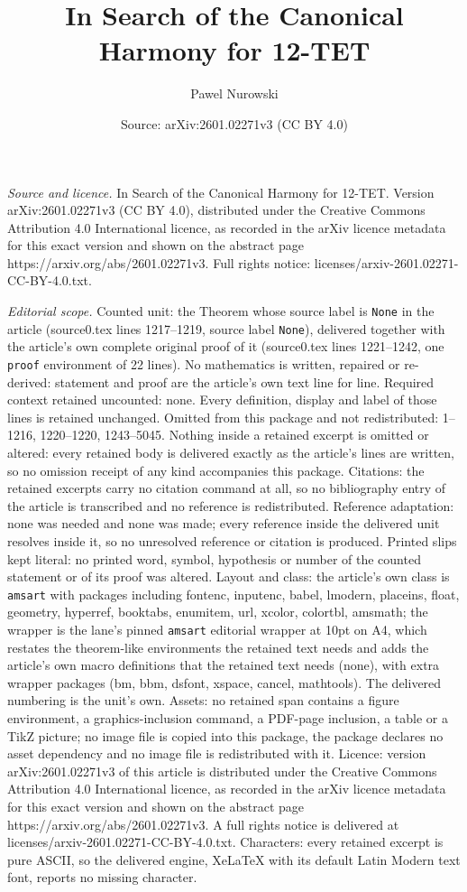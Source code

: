 \documentclass[10pt,a4paper]{amsart}
\title[In Search of the Canonical Harmony for 12-TET]{In Search of the Canonical Harmony for 12-TET}
\author{Pawel Nurowski}
\date{Source: arXiv:2601.02271v3 (CC BY 4.0)}
\begin{document}
\maketitle

\noindent\emph{Source and licence.} In Search of the Canonical Harmony for 12-TET. Version arXiv:2601.02271v3 (CC BY 4.0), distributed under the Creative Commons Attribution 4.0 International licence, as recorded in the arXiv licence metadata for this exact version and shown on the abstract page https://arxiv.org/abs/2601.02271v3. Full rights notice: licenses/arxiv-2601.02271-CC-BY-4.0.txt.\par\smallskip

\noindent\textit{Editorial scope.} Counted unit: the Theorem whose source label is \texttt{None} in the article (source0.tex lines 1217--1219, source label \texttt{None}), delivered together with the article's own complete original proof of it (source0.tex lines 1221--1242, one \texttt{proof} environment of 22 lines). No mathematics is written, repaired or re-derived: statement and proof are the article's own text line for line. Required context retained uncounted: none. Every definition, display and label of those lines is retained unchanged. Omitted from this package and not redistributed: 1--1216, 1220--1220, 1243--5045. Nothing inside a retained excerpt is omitted or altered: every retained body is delivered exactly as the article's lines are written, so no omission receipt of any kind accompanies this package. Citations: the retained excerpts carry no citation command at all, so no bibliography entry of the article is transcribed and no reference is redistributed. Reference adaptation: none was needed and none was made; every reference inside the delivered unit resolves inside it, so no unresolved reference or citation is produced. Printed slips kept literal: no printed word, symbol, hypothesis or number of the counted statement or of its proof was altered. Layout and class: the article's own class is \texttt{amsart} with packages including fontenc, inputenc, babel, lmodern, placeins, float, geometry, hyperref, booktabs, enumitem, url, xcolor, colortbl, amsmath; the wrapper is the lane's pinned \texttt{amsart} editorial wrapper at 10pt on A4, which restates the theorem-like environments the retained text needs and adds the article's own macro definitions that the retained text needs (none), with extra wrapper packages (bm, bbm, dsfont, xspace, cancel, mathtools). The delivered numbering is the unit's own. Assets: no retained span contains a figure environment, a graphics-inclusion command, a PDF-page inclusion, a table or a TikZ picture; no image file is copied into this package, the package declares no asset dependency and no image file is redistributed with it. Licence: version arXiv:2601.02271v3 of this article is distributed under the Creative Commons Attribution 4.0 International licence, as recorded in the arXiv licence metadata for this exact version and shown on the abstract page https://arxiv.org/abs/2601.02271v3. A full rights notice is delivered at licenses/arxiv-2601.02271-CC-BY-4.0.txt. Characters: every retained excerpt is pure ASCII, so the delivered engine, XeLaTeX with its default Latin Modern text font, reports no missing character.
\end{document}
